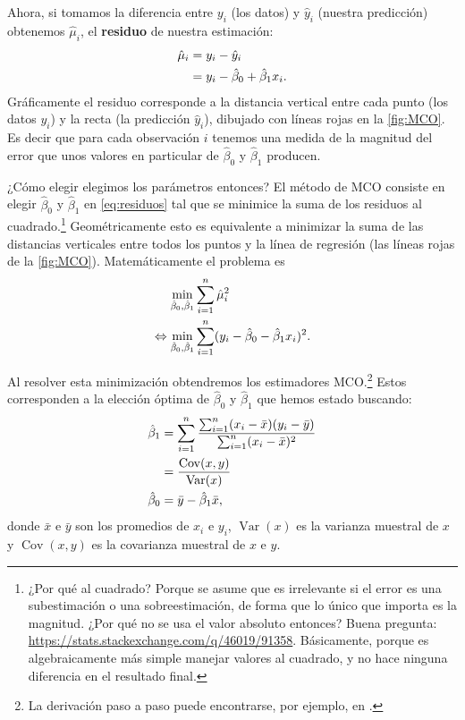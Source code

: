 \documentclass{report}\usepackage[]{graphicx}\usepackage[]{color}
\newcommand*{\kw}[1]{\textbf{#1}\index{#1}}
\newcommand{\Var}{\operatorname{Var}}
\newcommand{\Cov}{\operatorname{Cov}}
\begin{document}
Ahora, si tomamos la diferencia entre $y_i$ (los datos) y $\hat y_i$ (nuestra predicción) obtenemos $\hat\mu_i$, el \kw{residuo} de nuestra estimación:
\begin{align}
\hat \mu_i &= y_i - \hat y_i \notag \\
           &= y_i - \hat\beta_0 + \hat\beta_1 x_i.
\label{eq:residuos}
\end{align}
Gráficamente el residuo corresponde a la distancia vertical entre cada punto (los datos $y_i$) y la recta (la predicción $\hat y_i$), dibujado con líneas rojas en la \autoref{fig:MCO}.
Es decir que para cada observación $i$ tenemos una medida de la magnitud del error que unos valores en particular de $\hat\beta_0$ y $\hat\beta_1$ producen.

¿Cómo elegir elegimos los parámetros entonces?
El método de MCO consiste en elegir $\hat\beta_0$ y $\hat\beta_1$ en \eqref{eq:residuos} tal que se minimice la suma de los residuos al cuadrado.\footnote{¿Por qué al cuadrado? Porque se asume que es irrelevante si el error es una subestimación o una sobreestimación, de forma que lo único que importa es la magnitud. ¿Por qué no se usa el valor absoluto entonces? Buena pregunta: \url{https://stats.stackexchange.com/q/46019/91358}. Básicamente, porque es algebraicamente más simple manejar valores al cuadrado, y no hace ninguna diferencia en el resultado final.}
Geométricamente esto es equivalente a minimizar la suma de las distancias verticales entre todos los puntos y la línea de regresión (las líneas rojas de la \autoref{fig:MCO}).
Matemáticamente el problema es
\begin{align}
\min_{\hat\beta_0,\hat\beta_1} & \sum_{i=1}^n \hat\mu_i^2 \notag \\
\Leftrightarrow \min_{\hat\beta_0,\hat\beta_1} & \sum_{i=1}^n (y_i - \hat\beta_0 - \hat\beta_1 x_i)^2.
\label{eq:prob_min_MCO}
\end{align}

Al resolver esta minimización obtendremos los estimadores MCO.\footnote{La derivación paso a paso puede encontrarse, por ejemplo, en \textcite[cap. 2]{wooldridge_introductory_2016}.}
Estos corresponden a la elección óptima de $\hat\beta_0$ y $\hat\beta_1$ que hemos estado buscando:
\begin{align}
\hat \beta_1 &= \sum_{i=1}^n \frac{\sum_{i=1}^n (x_i - \bar x)(y_i - \bar y)}{\sum_{i=1}^n (x_i - \bar x)^2} \notag \\
 &= \frac{\Cov (x,y)}{\Var(x)} \label{eq:MCO_beta1} \\
\hat \beta_0 &= \bar y - \hat\beta_1 \bar x, \label{eq:MCO_beta0}
\end{align}
donde $\bar x$ e $\bar y$ son los promedios de $x_i$ e $y_i$, $\Var(x)$ es la varianza muestral de $x$ y $\Cov(x,y)$ es la covarianza muestral de $x$ e $y$.
\end{document}
